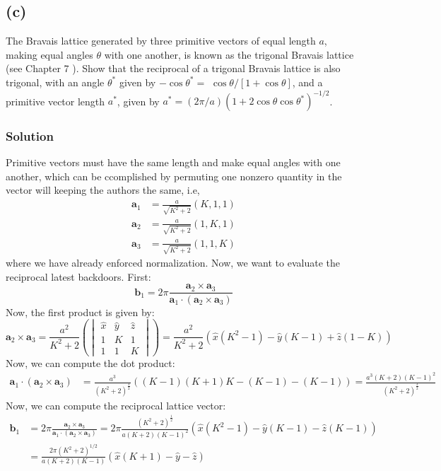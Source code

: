 \documentclass[12pt]{article}
\begin{document}
\subsection{(c)}
 The Bravais lattice generated by three primitive vectors of equal length $a$, making equal angles $\theta$ with one another, is known as the trigonal Bravais lattice (see Chapter 7 ). Show that the reciprocal of a trigonal Bravais lattice is also trigonal, with an angle $\theta^*$ given by $-\cos \theta^*=$ $\cos \theta /[1+\cos \theta]$, and a primitive vector length $a^*$, given by $a^*=(2 \pi / a)\left(1+2 \cos \theta \cos \theta^*\right)^{-1 / 2}$.
\subsubsection{Solution}
Primitive vectors must have the same length and make equal angles with one another, which can be ccomplished by permuting one nonzero quantity in the vector will keeping the authors the same, i.e,
\begin{align}
    \mathbf{a}_1 &= \frac{a}{\sqrt{K^2 +2}}(K,1,1) \\
    \mathbf{a}_2 &= \frac{a}{\sqrt{K^2 +2}}(1,K,1) \\
    \mathbf{a}_3 &= \frac{a}{\sqrt{K^2 +2}}(1,1,K)
\end{align}
where we have already enforced normalization. Now, we want to evaluate the reciprocal latest backdoors. First:
\begin{equation}
    \mathbf{b}_1 = 2\pi \frac{\mathbf{a}_2 \times \mathbf{a}_3}{\mathbf{a}_1 \cdot (\mathbf{a}_2 \times \mathbf{a}_3)}
\end{equation}
Now, the first product is given by:
\begin{equation}
    \mathbf{a}_2 \times \mathbf{a}_3 = \frac{a^2}{K^2 + 2} \left(\begin{vmatrix} \hat{x} & \hat{y} & \hat{z} \\ 1 & K & 1 \\ 1 & 1 & K \end{vmatrix}\right) = \frac{a^2}{K^2 + 2} \left(\hat{x}(K^2 - 1) - \hat{y}(K - 1) + \hat{z}(1 - K)\right)
\end{equation}
Now, we can compute the dot product:
\begin{align}
    \mathbf{a}_1 \cdot (\mathbf{a}_2 \times \mathbf{a}_3) &= \frac{a^3}{(K^2 + 2)^{\frac{3}{2}}} \left((K-1)(K+1)K -(K-1)-(K-1)\right) = \frac{a^3 (K+2)(K-1)^2}{(K^2 + 2)^{\frac{3}{2}}}
\end{align}
Now, we can compute the reciprocal lattice vector:
\begin{align}
    \mathbf{b}_1 &= 2\pi \frac{\mathbf{a}_2 \times \mathbf{a}_3}{\mathbf{a}_1 \cdot (\mathbf{a}_2 \times \mathbf{a}_3)} = 2\pi{\frac{(K^2 +2)^{\frac{1}{2}}}{a (K+2)(K-1)^2}} \left(\hat{x}(K^2 - 1) - \hat{y}(K - 1) - \hat{z}(K-1)\right) \\
    &= \frac{2\pi(K^2 +2)^{1/2}}{a (K+2)(K-1)} \left(\hat{x}(K+1) - \hat{y} - \hat{z}\right)
\end{align}
\end{document}
